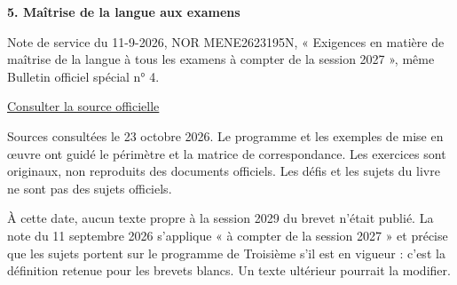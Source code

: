 \par\medskip\textbf{5. Maîtrise de la langue aux examens}\par Note de service du 11-9-2026, NOR MENE2623195N, « Exigences en matière de maîtrise de la langue à tous les examens à compter de la session 2027 », même Bulletin officiel spécial n° 4.\par\href{https://www.education.gouv.fr/sites/default/files/document/bulletin-officiel-special-ndeg-4-du-17-septembre-2026-521113.pdf}{\textcolor{otGreenDark}{Consulter la source officielle}}\par
\par\bigskip Sources consultées le 23 octobre 2026. Le programme et les exemples
de mise en œuvre ont guidé le périmètre et la matrice de correspondance. Les
exercices sont originaux, non reproduits des documents officiels. Les défis et
les sujets du livre ne sont pas des sujets officiels.\par\medskip
À cette date, aucun texte propre à la session 2029 du brevet n’était publié.
La note du 11 septembre 2026 s’applique « à compter de la session 2027 » et
précise que les sujets portent sur le programme de Troisième s’il est en vigueur :
c’est la définition retenue pour les brevets blancs. Un texte ultérieur pourrait
la modifier.

\clearpage
